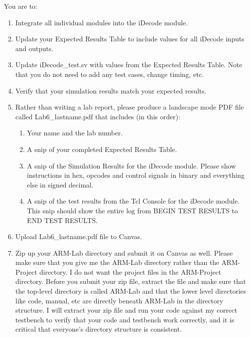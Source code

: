 You are to:
\begin{enumerate}
\item Integrate all individual modules into the iDecode module.
\item Update your Expected Results Table to include values for all iDecode inputs and outputs.
\item Update iDecode\_test.sv with values from the Expected Results Table.  Note that you do not need to add any test cases, change timing, etc.
\item Verify that your simulation results match your expected results.
\item Rather than writing a lab report, please produce a landscape mode PDF file called Lab6\_lastname.pdf that includes (in this order):
\begin{enumerate}
	\item Your name and the lab number.
	\item A snip of your completed Expected Results Table.
	\item A snip of the Simulation Results for the iDecode module.  Please show instructions in hex, opcodes and control signals in binary and everything else in signed decimal.  
	\item A snip of the test results from the Tcl Console for the iDecode module.  This snip should show the entire log from BEGIN TEST RESULTS to END TEST RESULTS.	
\end{enumerate}
\item Upload Lab6\_lastname.pdf file to Canvas.
\item Zip up your ARM-Lab directory and submit it on Canvas as well.  Please make sure that you give me the ARM-Lab directory rather than the ARM-Project directory.  I do not want the project files in the ARM-Project directory.  Before you submit your zip file, extract the file and make sure that the top-level directory is called ARM-Lab and that the lower level directories like code, manual, etc are directly beneath ARM-Lab in the directory structure.  I will extract your zip file and run your code against my correct testbench to verify that your code and testbench work correctly, and it is critical that everyone's directory structure is consistent.
\end{enumerate} 